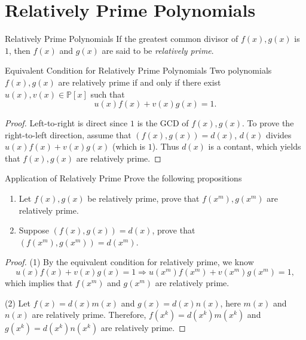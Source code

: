 \section{Relatively Prime Polynomials}

\begin{definition}{Relatively Prime Polynomials}{}
  If the greatest common divisor of $f(x), g(x)$ is $1$,
  then $f(x)$ and $g(x)$ are said to be \emph{relatively prime}.
\end{definition}

\begin{proposition}{Equivalent Condition for Relatively Prime Polynomials}{}
  Two polynomials $f(x), g(x)$ are relatively prime if and only if
  there exist $u(x), v(x) \in \mathbb{P}[x]$ such that
  \begin{equation}
    u(x)f(x) + v(x)g(x) = 1.
  \end{equation}
\end{proposition}

\begin{proof}
  Left-to-right is direct since $1$ is the GCD of $f(x), g(x)$.
  To prove the right-to-left direction, assume that $(f(x), g(x)) = d(x)$,
  $d(x)$ divides $u(x)f(x) + v(x)g(x)$ (which is $1$).
  Thus $d(x)$ is a contant, which yields that $f(x), g(x)$ are relatively prime.
\end{proof}

\begin{example}{Application of Relatively Prime}{}
  Prove the following propositions
  \begin{enumerate}
  \item Let $f(x), g(x)$ be relatively prime, prove that $f(x^m), g(x^m)$
    are relatively prime.
  \item Suppose $(f(x), g(x)) = d(x)$, prove that $(f(x^m), g(x^m)) = d(x^m)$.
  \end{enumerate}
\end{example}

\begin{proof}
  (1) By the equivalent condition for relatively prime, we know
  \begin{equation}
    u(x)f(x) + v(x)g(x) = 1 \Rightarrow u(x^m)f(x^m) + v(x^m)g(x^m) = 1,
  \end{equation}
  which implies that $f(x^m)$ and $g(x^m)$ are relatively prime.

  (2) Let $f(x) = d(x)m(x)$ and $g(x) = d(x)n(x)$, here $m(x)$ and $n(x)$ are
  relatively prime.
  Therefore, $f(x^k) = d(x^k)m(x^k)$ and $g(x^k) = d(x^k)n(x^k)$ are relatively prime.
\end{proof}


